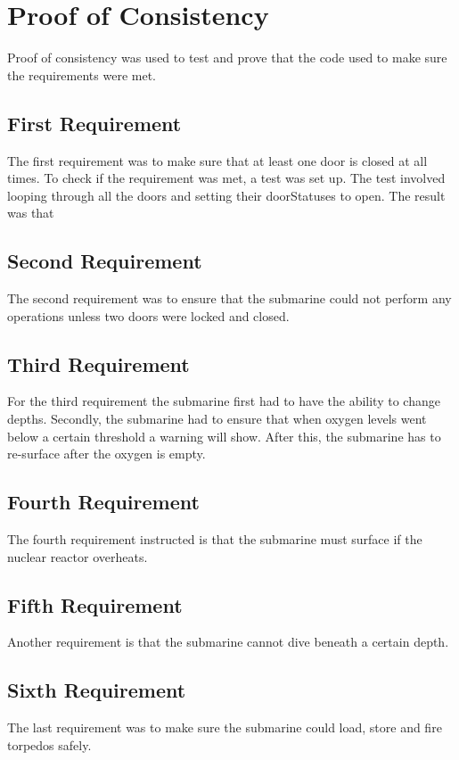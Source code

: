 \section{Proof of Consistency}
Proof of consistency was used to test and prove that the code used to make sure the requirements were met.

\subsection{First Requirement}
The first requirement was to make sure that at least one door is closed at all times. To check if the requirement was met, a test was set up. The test involved looping through all the doors and setting their doorStatuses to open. The result was that  

\subsection{Second Requirement}
The second requirement was to ensure that the submarine could not perform any operations unless two doors were locked and closed.

\subsection{Third Requirement}
For the third requirement the submarine first had to have the ability to change depths. Secondly, the submarine had to ensure that when oxygen levels went below a certain threshold a warning will show. After this, the submarine has to re-surface after the oxygen is empty. 

\subsection{Fourth Requirement}
The fourth requirement instructed is that the submarine must surface if the nuclear reactor overheats. 

\subsection{Fifth Requirement}
Another requirement is that the submarine cannot dive beneath a certain depth.

\subsection{Sixth Requirement}
The last requirement was to make sure the submarine could load, store and fire torpedos safely.